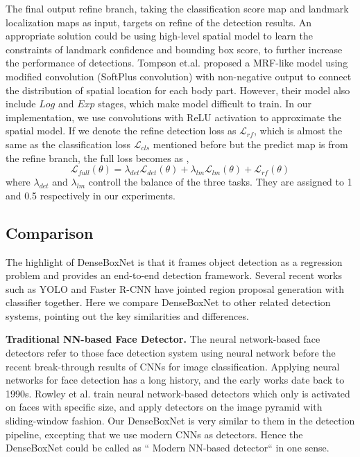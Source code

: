 The final output refine branch, taking the classification score map and landmark localization maps as input, targets on refine of the detection results.  An appropriate solution could be using high-level spatial model to learn the constraints of landmark confidence and bounding box score, to further increase the performance of detections. Tompson et.al.\cite{tompson2014joint} proposed a MRF-like model using modified convolution (SoftPlus convolution) with non-negative output to connect the distribution of spatial location for each body part.  However, their model also include $Log$ and $Exp$ stages, which make model difficult to train.  In our implementation, we use convolutions with ReLU activation to approximate the spatial model.  If we denote the refine detection loss as $\mathcal{L} _{rf}$, which is almost the same as the classification loss $\mathcal{L} _{cls}$ mentioned before but the predict map is from the refine branch, the full loss becomes as ,
	\begin{equation}\label{eq:eq_full_loss}
	\mathcal{L} _{full}(\theta) = \lambda_{det} \mathcal{L} _{det}(\theta) + \lambda_{lm} \mathcal{L} _{lm}(\theta) + \mathcal{L} _{rf}(\theta)
	\end{equation}
where $\lambda_{det}$ and $\lambda_{lm}$ controll the balance of the three tasks. They are assigned to 1 and 0.5 respectively in our experiments. 

\subsection{Comparison } 
The highlight of DenseBoxNet is that it frames object detection as a regression problem and provides an end-to-end detection framework.  Several recent works such as YOLO and Faster R-CNN have jointed region proposal generation with classifier together. Here we compare DenseBoxNet to other related detection systems, pointing out the key similarities and differences. 
 
\textbf{Traditional NN-based Face Detector.} The neural network-based face detectors refer to those face detection system using neural network before the recent break-through results of CNNs for image classification. Applying neural networks for face detection has a long history, and the early works date back to 1990s\cite{vaillant1994original}.  Rowley et al.\cite{rowley1998neural} train neural network-based detectors which only is activated on faces with specific size, and apply detectors on the image pyramid with sliding-window fashion. Our DenseBoxNet is very similar to them in the detection pipeline, excepting that we use modern CNNs as detectors. Hence the DenseBoxNet could be called as `` Modern NN-based detector“ in one sense. 

